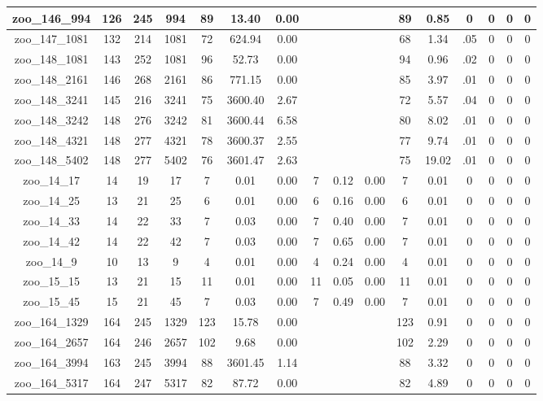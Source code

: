 \begin{landscape}
\begin{longtable}{|c|c|c|c|c|c|c|c|c|c|c|c|c|c|c|c|}
zoo\_146\_994 & 126 & 245 & 994 & 89 & 13.40 & 0.00 &  &  &  & 89 & 0.85 & 0 & 0 & 0 & 0 \\ \hline 
zoo\_147\_1081 & 132 & 214 & 1081 & 72 & 624.94 & 0.00 &  &  &  & 68 & 1.34 & .05 & 0 & 0 & 0 \\ \hline 
zoo\_148\_1081 & 143 & 252 & 1081 & 96 & 52.73 & 0.00 &  &  &  & 94 & 0.96 & .02 & 0 & 0 & 0 \\ \hline 
zoo\_148\_2161 & 146 & 268 & 2161 & 86 & 771.15 & 0.00 &  &  &  & 85 & 3.97 & .01 & 0 & 0 & 0 \\ \hline 
zoo\_148\_3241 & 145 & 216 & 3241 & 75 & 3600.40 & 2.67 &  &  &  & 72 & 5.57 & .04 & 0 & 0 & 0 \\ \hline 
zoo\_148\_3242 & 148 & 276 & 3242 & 81 & 3600.44 & 6.58 &  &  &  & 80 & 8.02 & .01 & 0 & 0 & 0 \\ \hline 
zoo\_148\_4321 & 148 & 277 & 4321 & 78 & 3600.37 & 2.55 &  &  &  & 77 & 9.74 & .01 & 0 & 0 & 0 \\ \hline 
zoo\_148\_5402 & 148 & 277 & 5402 & 76 & 3601.47 & 2.63 &  &  &  & 75 & 19.02 & .01 & 0 & 0 & 0 \\ \hline 
zoo\_14\_17 & 14 & 19 & 17 & 7 & 0.01 & 0.00 & 7 & 0.12 & 0.00 & 7 & 0.01 & 0 & 0 & 0 & 0 \\ \hline 
zoo\_14\_25 & 13 & 21 & 25 & 6 & 0.01 & 0.00 & 6 & 0.16 & 0.00 & 6 & 0.01 & 0 & 0 & 0 & 0 \\ \hline 
zoo\_14\_33 & 14 & 22 & 33 & 7 & 0.03 & 0.00 & 7 & 0.40 & 0.00 & 7 & 0.01 & 0 & 0 & 0 & 0 \\ \hline 
zoo\_14\_42 & 14 & 22 & 42 & 7 & 0.03 & 0.00 & 7 & 0.65 & 0.00 & 7 & 0.01 & 0 & 0 & 0 & 0 \\ \hline 
zoo\_14\_9 & 10 & 13 & 9 & 4 & 0.01 & 0.00 & 4 & 0.24 & 0.00 & 4 & 0.01 & 0 & 0 & 0 & 0 \\ \hline 
zoo\_15\_15 & 13 & 21 & 15 & 11 & 0.01 & 0.00 & 11 & 0.05 & 0.00 & 11 & 0.01 & 0 & 0 & 0 & 0 \\ \hline 
zoo\_15\_45 & 15 & 21 & 45 & 7 & 0.03 & 0.00 & 7 & 0.49 & 0.00 & 7 & 0.01 & 0 & 0 & 0 & 0 \\ \hline 
zoo\_164\_1329 & 164 & 245 & 1329 & 123 & 15.78 & 0.00 &  &  &  & 123 & 0.91 & 0 & 0 & 0 & 0 \\ \hline 
zoo\_164\_2657 & 164 & 246 & 2657 & 102 & 9.68 & 0.00 &  &  &  & 102 & 2.29 & 0 & 0 & 0 & 0 \\ \hline 
zoo\_164\_3994 & 163 & 245 & 3994 & 88 & 3601.45 & 1.14 &  &  &  & 88 & 3.32 & 0 & 0 & 0 & 0 \\ \hline 
zoo\_164\_5317 & 164 & 247 & 5317 & 82 & 87.72 & 0.00 &  &  &  & 82 & 4.89 & 0 & 0 & 0 & 0 \\ \hline 

\end{longtable}
\end{landscape}
